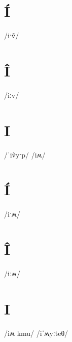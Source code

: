 \documentclass[10pt,a4paper,twoside]{book}
\begin{document}
\section*{Í}

\begin{multicols}{3}
 {/iˑṽ/} {}
\end{multicols}

\section*{Î}

\begin{multicols}{3}
 {/iːv/} {}
\end{multicols}

\section*{I}

\begin{multicols}{3}
 {/ˈiṽyˑp/} {}
 {/iʍ/} {}
\end{multicols}

\section*{Í}

\begin{multicols}{3}
 {/iˑʍ/} {}
\end{multicols}

\section*{Î}

\begin{multicols}{3}
 {/iːʍ/} {}
\end{multicols}

\section*{I}

\begin{multicols}{3}
 {/iʍ kmu/} {}
 {/iˈʍyːteθ/} {}
\end{multicols}
\end{document}
